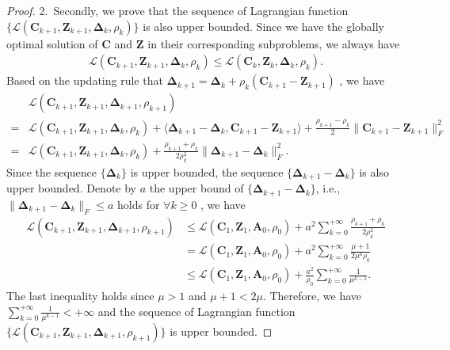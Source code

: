 \begin{proof}
2.\ Secondly, we prove that the sequence of Lagrangian function $\{\mathcal{L}(\bm{C}_{k+1},\bm{Z}_{k+1},\bm{\Delta}_{k},\rho_{k})\}$ is also upper bounded. Since we have the globally optimal solution of $\bm{C}$ and $\bm{Z}$ in their corresponding subproblems, we always have 
\begin{align}
\mathcal{L}(\bm{C}_{k+1},\bm{Z}_{k+1},\bm{\Delta}_{k},\rho_{k})
\le
\mathcal{L}(\bm{C}_{k},\bm{Z}_{k},\bm{\Delta}_{k},\rho_{k}).
\end{align}
Based on the updating rule that 
$
\bm{\Delta}_{k+1}
=
\bm{\Delta}_{k} + \rho_{k}(\bm{C}_{k+1}-\bm{Z}_{k+1})
$
,
we have 
\begin{align}
&
\mathcal{L}(\bm{C}_{k+1},\bm{Z}_{k+1},\bm{\Delta}_{k+1},\rho_{k+1})
\\
=
&
\mathcal{L}(\bm{C}_{k+1},\bm{Z}_{k+1},\bm{\Delta}_{k},\rho_{k})
+
\langle
\bm{\Delta}_{k+1}
-
\bm{\Delta}_{k}
,
\bm{C}_{k+1}
-
\bm{Z}_{k+1}
\rangle
+
\frac{\rho_{k+1}-\rho_{k}}{2}
\|
\bm{C}_{k+1}-\bm{Z}_{k+1}
\|_{F}^{2}
\\
=
&
\mathcal{L}(\bm{C}_{k+1},\bm{Z}_{k+1},\bm{\Delta}_{k},\rho_{k})
+
\frac{\rho_{k+1}+\rho_{k}}{2\rho_{k}^{2}}
\|
\bm{\Delta}_{k+1}
-
\bm{\Delta}_{k}
\|_{F}^{2}.
\end{align}
Since the sequence 
$\{
\bm{\Delta}_{k}\}$
is upper bounded, the sequence 
$\{
\bm{\Delta}_{k+1}
-
\bm{\Delta}_{k}
\}$ is also upper bounded. Denote by $a$ the upper bound of 
$\{
\bm{\Delta}_{k+1}
-
\bm{\Delta}_{k}
\}$, 
i.e., 
$
\|
\bm{\Delta}_{k+1}
-
\bm{\Delta}_{k}
\|_{F}\le a
$
holds for
$\forall k\ge0$
,
we have 
\begin{align}
\mathcal{L}(\bm{C}_{k+1},\bm{Z}_{k+1},\bm{\Delta}_{k+1},\rho_{k+1})
&
\le
\mathcal{L}(\bm{C}_{1},\bm{Z}_{1},\bm{A}_{0},\rho_{0})
+
a^2\sum_{k=0}^{+\infty}\frac{\rho_{k+1}+\rho_{k}}{2\rho_{k}^{2}}
\\
&
=
\mathcal{L}(\bm{C}_{1},\bm{Z}_{1},\bm{A}_{0},\rho_{0})
+
a^2\sum_{k=0}^{+\infty}\frac{\mu+1}{2\mu^{k}\rho_{0}}
\\
&
\le
\mathcal{L}(\bm{C}_{1},\bm{Z}_{1},\bm{A}_{0},\rho_{0})
+
\frac{a^2}{\rho_{0}}\sum_{k=0}^{+\infty}\frac{1}{\mu^{k-1}}.
\end{align}
The last inequality holds since $\mu>1$ and $\mu+1<2\mu$. Therefore, we have $\sum_{k=0}^{+\infty}\frac{1}{\mu^{k-1}}<+\infty$ and the sequence of Lagrangian function 
$\{\mathcal{L}(\bm{C}_{k+1},\bm{Z}_{k+1},\bm{\Delta}_{k+1},\rho_{k+1})\}$
is upper bounded.


\end{proof}
